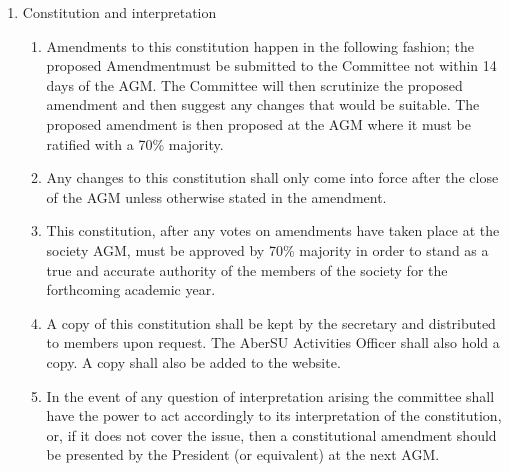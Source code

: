 \documentclass{article}
\begin{document}
\begin{enumerate}
\begin{enumerate}
        \end{enumerate}
    \item Constitution and interpretation
        \begin{enumerate}
            \item Amendments to this constitution happen in the following fashion; the proposed Amendmentmust be submitted to the Committee not within 14 days of the AGM. The Committee will then scrutinize the proposed amendment and then suggest any changes that would be suitable. The proposed amendment is then proposed at the AGM where it must be ratified with a 70\% majority.
            \item Any changes to this constitution shall only come into force after the close of the AGM unless otherwise stated in the amendment.
            \item This constitution, after any votes on amendments have taken place at the society AGM, must be approved by 70\% majority in order to stand as a true and accurate authority of the members of the society for the forthcoming academic year.
            \item A copy of this constitution shall be kept by the secretary and distributed to members upon request. The AberSU Activities Officer shall also hold a copy. A copy shall also be added to the website.
            \item In the event of any question of interpretation arising the committee shall have the power to act accordingly to its interpretation of the constitution, or, if it does not cover the issue, then a constitutional amendment should be presented by the President (or equivalent) at the next AGM.
        \end{enumerate}
\end{enumerate}
\end{document}

